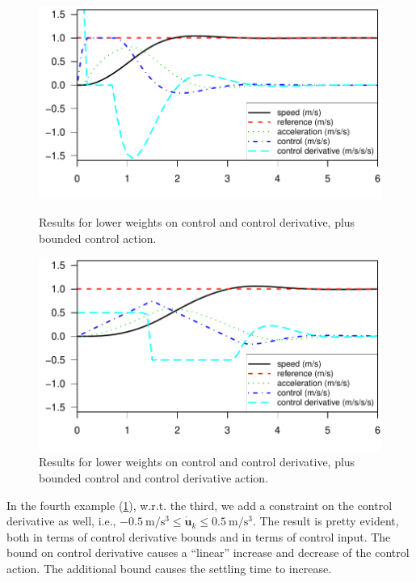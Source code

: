 \documentclass[10pt,a4paper]{article}
\newcommand{\duk}{\ensuremath{\bm{\dot{u}}_k}\xspace}
\def\pwidth{0.49}
\begin{document}
\begin{figure}[h]
    \centering
    \begin{minipage}[t]{\pwidth\textwidth}
        \includegraphics[width=\textwidth]{./fig/test03}
        \caption{Results for lower weights on control and control derivative, plus bounded control action.}
        \label{fig:test03}
    \end{minipage}
    \hfill
    \begin{minipage}[t]{\pwidth\textwidth}
        \includegraphics[width=\textwidth]{./fig/test04}
        \caption{Results for lower weights on control and control derivative, plus bounded control and control derivative action.}
        \label{fig:test04}
    \end{minipage}
\end{figure}

In the fourth example (\cref{fig:test04}), w.r.t. the third, we add a constraint on the control derivative as well, i.e., $\SI{-0.5}{\meter\per\second\cubed} \leq \duk \leq \SI{0.5}{\meter\per\second\cubed}$.
The result is pretty evident, both in terms of control derivative bounds and in terms of control input.
The bound on control derivative causes a ``linear'' increase and decrease of the control action.
The additional bound causes the settling time to increase.
\end{document}
